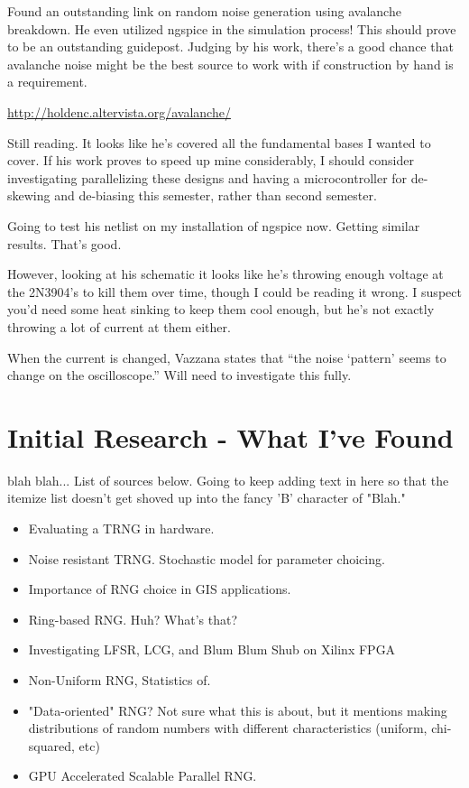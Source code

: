 \documentclass[journal]{IEEEtran}
\begin{document}
Found an outstanding link on random noise generation using avalanche 
breakdown. He even utilized ngspice in the simulation process! This should 
prove to be an outstanding guidepost. Judging by his work, there's a good 
chance that avalanche noise might be the best source to work with if 
construction by hand is a requirement.

\url{http://holdenc.altervista.org/avalanche/}

Still reading. It looks like he's covered all the fundamental bases I wanted 
to cover. If his work proves to speed up mine considerably, I should 
consider investigating parallelizing these designs and having a 
microcontroller for de-skewing and de-biasing this semester, rather than 
second semester.

Going to test his netlist on my installation of ngspice now. Getting similar 
results. That's good.

However, looking at his schematic it looks like he's throwing enough voltage 
at the 2N3904's to kill them over time, though I could be reading it wrong. I 
suspect you'd need some heat sinking to keep them cool enough, but he's not 
exactly throwing a lot of current at them either. 

When the current is changed, Vazzana states that ``the noise `pattern' seems to
change on the oscilloscope.'' Will need to investigate this fully.

\section{Initial Research - What I've Found}

 blah blah... List of sources below. Going to keep 
adding text in here so that the itemize list doesn't get shoved up into 
the fancy 'B' character of "Blah."

\begin{itemize}
\item
\cite{000321520700011n.d.} Evaluating a TRNG in hardware.
\item
\cite{000322026900007n.d.} Noise resistant TRNG. Stochastic model for parameter choicing.
\item
\cite{6082794820110401} Importance of RNG choice in GIS applications.
\item
\cite{6102549620110515} Ring-based RNG. Huh? What's that?
\item
\cite{8288132620110601} Investigating LFSR, LCG, and Blum Blum Shub on 
Xilinx FPGA
\item
\cite{8704557320120101} Non-Uniform RNG, Statistics of.
\item
\cite{8762674520130201} "Data-oriented" RNG? Not sure what this is about, but it mentions 
making distributions of random numbers with different characteristics (uniform, chi-squared, 
etc)
\item
\cite{000315974100018n.d.} GPU Accelerated Scalable Parallel RNG.
\end{itemize}

{}

\end{document}
